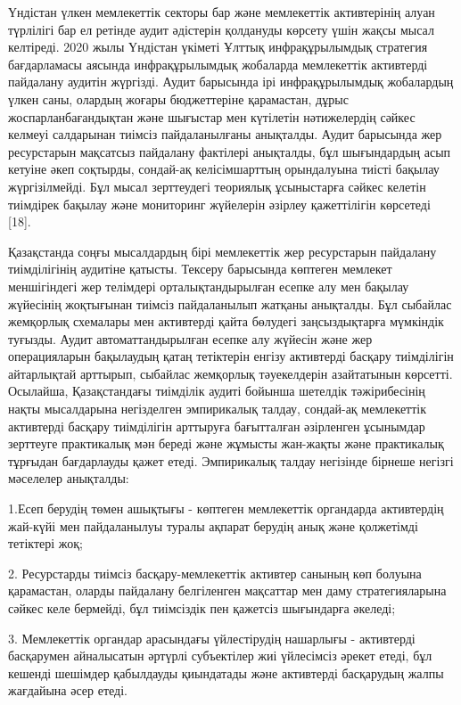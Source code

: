 Үндістан үлкен мемлекеттік секторы бар және мемлекеттік активтерінің
алуан түрлілігі бар ел ретінде аудит әдістерін қолдануды көрсету үшін
жақсы мысал келтіреді. 2020 жылы Үндістан үкіметі Ұлттық инфрақұрылымдық
стратегия бағдарламасы аясында инфрақұрылымдық жобаларда мемлекеттік
активтерді пайдалану аудитін жүргізді. Аудит барысында ірі
инфрақұрылымдық жобалардың үлкен саны, олардың жоғары бюджеттеріне
қарамастан, дұрыс жоспарланбағандықтан және шығыстар мен күтілетін
нәтижелердің сәйкес келмеуі салдарынан тиімсіз пайдаланылғаны анықталды.
Аудит барысында жер ресурстарын мақсатсыз пайдалану фактілері анықталды,
бұл шығындардың асып кетуіне әкеп соқтырды, сондай-ақ келісімшарттың
орындалуына тиісті бақылау жүргізілмейді. Бұл мысал зерттеудегі
теориялық ұсыныстарға сәйкес келетін тиімдірек бақылау және мониторинг
жүйелерін әзірлеу қажеттілігін көрсетеді {[}18{]}.

Қазақстанда соңғы мысалдардың бірі мемлекеттік жер ресурстарын пайдалану
тиімділігінің аудитіне қатысты. Тексеру барысында көптеген мемлекет
меншігіндегі жер телімдері орталықтандырылған есепке алу мен бақылау
жүйесінің жоқтығынан тиімсіз пайдаланылып жатқаны анықталды. Бұл
сыбайлас жемқорлық схемалары мен активтерді қайта бөлудегі
заңсыздықтарға мүмкіндік туғызды. Аудит автоматтандырылған есепке алу
жүйесін және жер операцияларын бақылаудың қатаң тетіктерін енгізу
активтерді басқару тиімділігін айтарлықтай арттырып, сыбайлас жемқорлық
тәуекелдерін азайтатынын көрсетті. Осылайша, Қазақстандағы тиімділік
аудиті бойынша шетелдік тәжірибесінің нақты мысалдарына негізделген
эмпирикалық талдау, сондай-ақ мемлекеттік активтерді басқару тиімділігін
арттыруға бағытталған әзірленген ұсынымдар зерттеуге практикалық мән
береді және жұмысты жан-жақты және практикалық тұрғыдан бағдарлауды
қажет етеді. Эмпирикалық талдау негізінде бірнеше негізгі мәселелер
анықталды:

1.Есеп берудің төмен ашықтығы - көптеген мемлекеттік органдарда
активтердің жай-күйі мен пайдаланылуы туралы ақпарат берудің анық және
қолжетімді тетіктері жоқ;

2. Ресурстарды тиімсіз басқару-мемлекеттік активтер санының көп болуына
қарамастан, оларды пайдалану белгіленген мақсаттар мен даму
стратегияларына сәйкес келе бермейді, бұл тиімсіздік пен қажетсіз
шығындарға әкеледі;

3. Мемлекеттік органдар арасындағы үйлестірудің нашарлығы - активтерді
басқарумен айналысатын әртүрлі субъектілер жиі үйлесімсіз әрекет етеді,
бұл кешенді шешімдер қабылдауды қиындатады және активтерді басқарудың
жалпы жағдайына әсер етеді.

